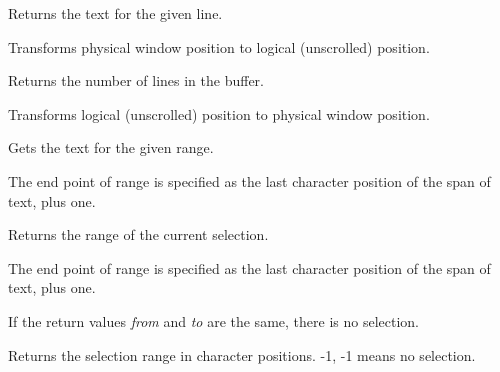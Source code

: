
Returns the text for the given line.

\label{wxrichtextctrlgetlogicalpoint}


Transforms physical window position to logical (unscrolled) position.

\label{wxrichtextctrlgetnumberoflines}


Returns the number of lines in the buffer.

\label{wxrichtextctrlgetphysicalpoint}


Transforms logical (unscrolled) position to physical window position.

\label{wxrichtextctrlgetrange}


Gets the text for the given range.

The end point of range is specified as the last character position of the span of text, plus one.

\label{wxrichtextctrlgetselection}


Returns the range of the current selection.

The end point of range is specified as the last character position of the span of text, plus one.

If the return values {\it from} and {\it to} are the same, there is no selection.

\label{wxrichtextctrlgetselectionrange}


Returns the selection range in character positions. -1, -1 means no selection.

\label{wxrichtextctrlgetstringselection}

